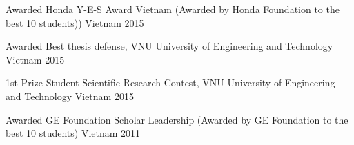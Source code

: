 
\begin{cvhonors}

  \cvhonor
    {Awarded} %
    {\href{http://www.hondafoundation.jp/yes/index_en/184}{Honda Y-E-S Award Vietnam} (Awarded by Honda Foundation to the best 10 students))} %
    {Vietnam} %
    {2015} %

  \cvhonor
    {Awarded} %
    {Best thesis defense, VNU University of Engineering and Technology} %
    {Vietnam} %
    {2015} %

  \cvhonor
    {1st Prize} %
    {Student Scientific Research Contest, VNU University of Engineering and Technology} %
    {Vietnam} %
    {2015} %

  \cvhonor
    {Awarded} %
    {GE Foundation Scholar Leadership (Awarded by GE Foundation to the best 10 students)} %
    {Vietnam} %
    {2011} %

\end{cvhonors}








